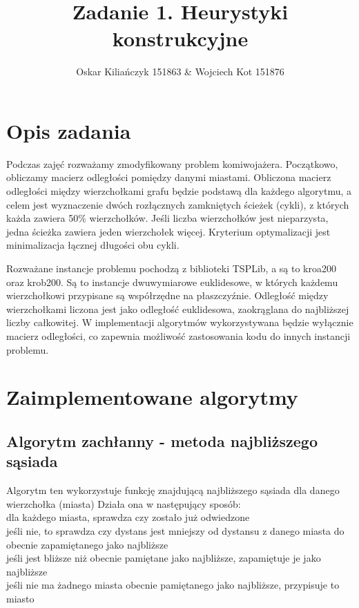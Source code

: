 \documentclass[11pt]{article}
\title{Zadanie 1. Heurystyki konstrukcyjne}
\author{Oskar Kiliańczyk 151863 \& Wojciech Kot 151876}
\date{}
\begin{document}
\maketitle
\newpage

\section{Opis zadania}\label{sec:opis-zadania}

Podczas zajęć rozważamy zmodyfikowany problem komiwojażera.
Początkowo, obliczamy macierz odległości pomiędzy danymi miastami.
Obliczona macierz odległości między wierzchołkami grafu będzie podstawą dla każdego algorytmu,
a celem jest wyznaczenie dwóch rozłącznych zamkniętych ścieżek (cykli), z których każda zawiera 50\% wierzchołków.
Jeśli liczba wierzchołków jest nieparzysta, jedna ścieżka zawiera jeden wierzchołek więcej.
Kryterium optymalizacji jest minimalizacja łącznej długości obu cykli.

Rozważane instancje problemu pochodzą z biblioteki TSPLib, a są to kroa200 oraz krob200.
Są to instancje dwuwymiarowe euklidesowe, w których każdemu wierzchołkowi przypisane są współrzędne na płaszczyźnie.
Odległość między wierzchołkami liczona jest jako odległość euklidesowa, zaokrąglana do najbliższej liczby całkowitej.
W implementacji algorytmów wykorzystywana będzie wyłącznie macierz odległości, co zapewnia możliwość zastosowania kodu do innych instancji problemu.

\section{Zaimplementowane algorytmy}\label{sec:zaimplementowane-algorytmy}

\subsection{Algorytm zachłanny - metoda najbliższego sąsiada}\label{subsec:algorytm-zachanny---metoda-najblizszego-sasiada}

Algorytm ten wykorzystuje funkcję znajdującą najbliższego sąsiada dla danego wierzchołka (miasta)
Działa ona w następujący sposób: \\
dla każdego miasta, sprawdza czy zostało już odwiedzone \\
jeśli nie, to sprawdza czy dystans jest mniejszy od dystansu z danego miasta do obecnie zapamiętanego jako najbliższe \\
jeśli jest bliższe niż obecnie pamiętane jako najbliższe, zapamiętuje je jako najbliższe \\
jeśli nie ma żadnego miasta obecnie pamiętanego jako najbliższe, przypisuje to miasto \\
\end{document}
